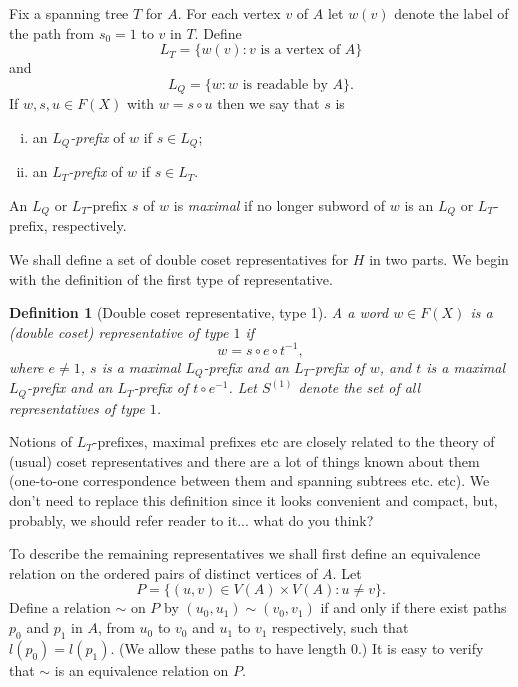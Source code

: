 \documentclass[a4paper,12pt]{article}
\newtheorem{definition}[theorem]{Definition}
\numberwithin{equation}{section}
\numberwithin{figure}{section}
\newcommand{\be}{\begin{enumerate}}
\newcommand{\ee}{\end{enumerate}}
\begin{document}
Fix a spanning tree $T$ for $A$. For each vertex $v$ of $A$
let $w(v)$ denote the label of the path from $s_0=1$ to $v$ in
$T$.  Define
\[L_T=\{w(v): v \textrm{ is a vertex of } A\}\]
and 
\[L_Q=\{w:w \textrm{ is readable by } A\}.\]
If $w, s, u\in F(X)$ with $w=s\circ u$ then we say that $s$ is 
\be[(i)]
\item
 an $L_Q${\em -prefix} of $w$ if $s\in L_Q$;  
\item 
an %
$L_T${\em -prefix} of $w$ if $s\in L_T$.
\ee
An $L_Q$ or $L_T$-prefix $s$ of $w$ is  {\em maximal} if no longer
subword of $w$ is an $L_Q$ or $L_T$-prefix, respectively. 

We shall define a set of double coset representatives for $H$ in two parts.
We begin with the definition of the first type of representative. 
\begin{definition}[Double coset representative, type 1]
A a word $w\in F(X)$ is a {\em (double coset) representative of type} $1$ if
\[w=s\circ e \circ t^{-1},\]
where $e\neq 1$, $s$ is a maximal $L_Q$-prefix and an $L_T$-prefix of $w$, 
and $t$ is a maximal $L_Q$-prefix and an 
$L_T$-prefix of $t\circ e^{-1}$. Let $S^{(1)}$ denote the set of all representatives of type $1$.
\end{definition}

{\ef Notions of $L_T$-prefixes, maximal prefixes etc are closely related to the theory of (usual) coset
 representatives and there are a lot of things known about them (one-to-one correspondence between them and spanning subtrees etc. etc).
 We don't need to replace this definition since it looks convenient and compact, but, probably, we should refer reader to it... what do you think?
}



To describe the remaining representatives we shall first define an equivalence
relation on the ordered pairs of distinct vertices of $A$. Let
\[P=\{(u,v)\in V(A)\times V(A): u\neq v\}.\]
Define a relation $\sim$ on $P$ by $(u_0,u_1)\sim (v_0,v_1)$ if and only if
there exist paths $p_0$ and $p_1$ in $A$, from $u_0$ to $v_0$ and $u_1$ to $v_1$
respectively, such that $l(p_0)=l(p_1)$. (We allow these paths to have length $0$.)
It is easy to verify that $\sim$ is an equivalence relation on $P$.
\end{document}
